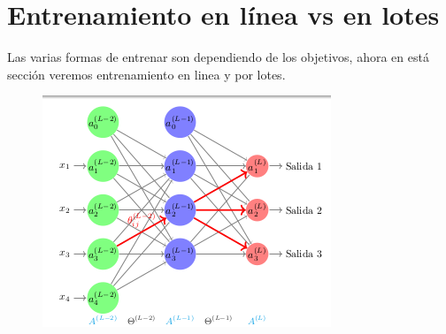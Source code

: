 \section{Entrenamiento en línea vs en lotes}

Las varias formas de entrenar son dependiendo de los objetivos, ahora en está sección veremos entrenamiento en linea y por lotes.

\begin{figure}[H]
 \centering
 \includegraphics[scale=0.8]{../Figuras/AredN.png}
 \label{fig:graficaLog}
\end{figure}
